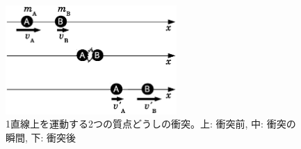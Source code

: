 %

\begin{figure}[h]
    \centering
    \includegraphics[width=6.5cm]{collision2.eps}
    \caption{1直線上を運動する2つの質点どうしの衝突。上: 衝突前, 中: 衝突の瞬間, 下: 衝突後}\label{fig:collision2}
\end{figure}

